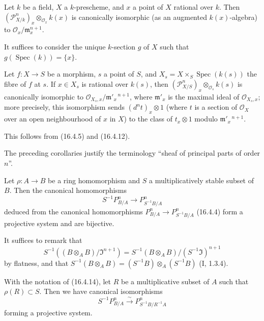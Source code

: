 \begin{corollary}[16.4.12]
\label{IV.16.4.12}
Let $k$ be a field, $X$ a $k$-prescheme, and $x$ a point of $X$ rational over
$k$. Then $(\mathscr{P}_{X/k}^n)_x\otimes_{\mathcal{O}_x}k(x)$ is
canonically isomorphic (as an augmented $k(x)$-algebra) to
$\mathcal{O}_x/\mathfrak{m}_x^{n+1}$.
\end{corollary}

It suffices to consider the unique $k$-section $g$ of $X$ such that
$g(\operatorname{Spec}(k))=\{x\}$.

\begin{corollary}[16.4.13]
\label{IV.16.4.13}
Let $f:X\to S$ be a morphism, $s$ a point of $S$, and
$X_s=X\times_S\operatorname{Spec}(k(s))$ the fibre of $f$ at $s$. If
$x\in X_s$ is rational over $k(s)$, then
$(\mathscr{P}_{X/S}^n)_x\otimes_{\mathcal{O}_s}k(s)$ is canonically
isomorphic to $\mathcal{O}_{X_s,x}/\mathfrak{m}'_x{}^{\,n+1}$, where
$\mathfrak{m}'_x$ is the maximal ideal of $\mathcal{O}_{X_s,x}$; more
precisely, this isomorphism sends $(d^n t)_x\otimes1$ (where $t$ is a
section of $\mathcal{O}_X$ over an open neighbourhood of $x$ in
$X$) to the class of $t_x\otimes1$ modulo $\mathfrak{m}'_x{}^{\,n+1}$.
\end{corollary}

This follows from (16.4.5) and (16.4.12).

The preceding corollaries justify the terminology ``sheaf of principal parts
of order $n$''.

\begin{proposition}[16.4.14]
\label{IV.16.4.14}
Let $\rho:A\to B$ be a ring homomorphism and $S$ a multiplicatively stable
subset of $B$. Then the canonical homomorphisms
\[
  S^{-1}P_{B/A}^n\longrightarrow P_{S^{-1}B/A}^n
  \tag{16.4.14.1}
  \label{IV.16.4.14.1}
\]
deduced from the canonical homomorphisms
$P_{B/A}^n\to P_{S^{-1}B/A}^n$ (16.4.4) form a projective system and are
bijective.
\end{proposition}

It suffices to remark that
\[
  S^{-1}((B\otimes_A B)/\mathfrak{I}^{n+1})
  =S^{-1}(B\otimes_A B)/(S^{-1}\mathfrak{I})^{n+1}
\]
by flatness, and that
$S^{-1}(B\otimes_A B)=(S^{-1}B)\otimes_A(S^{-1}B)$ (I, 1.3.4).

\begin{corollary}[16.4.15]
\label{IV.16.4.15}
With the notation of (16.4.14), let $R$ be a multiplicative subset of
$A$ such that $\rho(R)\subset S$. Then we have canonical isomorphisms
\[
  S^{-1}P_{B/A}^n\xrightarrow{\sim}P_{S^{-1}B/R^{-1}A}^n
  \tag{16.4.15.1}
  \label{IV.16.4.15.1}
\]
forming a projective system.
\end{corollary}

